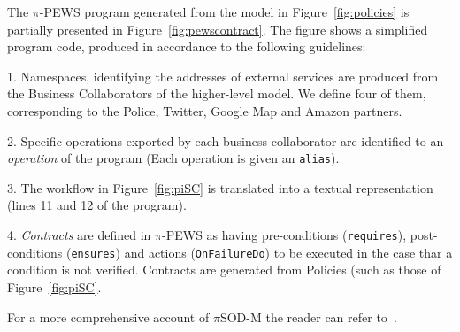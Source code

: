 The $\pi$-PEWS program generated from the model in Figure~\ref{fig:policies} is partially presented in Figure~\ref{fig:pewscontract}. 
The figure shows a simplified program code, produced in accordance to the following guidelines:
\begin{trivlist}
\item[1.] Namespaces, identifying the addresses of external services are produced from the Business Collaborators of the higher-level model. 
We define four of them, corresponding to the Police, Twitter, Google Map and Amazon partners.
\item[2.] Specific operations exported by each business collaborator are identified to an \textit{operation} of the program (Each operation is given an \texttt{alias}).
\item[3.] The workflow in Figure~\ref{fig:piSC} is translated into a textual representation (lines 11 and 12 of the program).
\item[4.] \textit{Contracts} are defined in $\pi$-PEWS as having pre-conditions (\texttt{requires}), post-conditions (\texttt{ensures}) and actions (\texttt{OnFailureDo}) to be executed in the case thar a condition is not verified. 
Contracts are generated from Policies (such as those of Figure~\ref{fig:piSC}.
\end{trivlist}


For a more comprehensive account of $\pi$SOD-M the reader can refer to~\cite{SouzaNeto:2012}.

